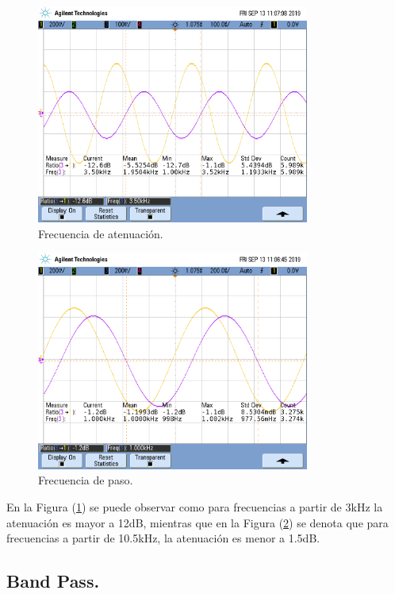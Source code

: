 \begin{figure}[H]	
	\centering
	\includegraphics[width=0.8\textwidth, trim = {0 3.35cm 0 2cm},clip]{ImagenesEj2/MedicionesGrilla/fa_lp.png}
	\caption{Frecuencia de atenuación.}
	\label{fig:falp}
\end{figure}
\begin{figure}[H]	
	\centering
	\includegraphics[width=0.8\textwidth, trim = {0 3.35cm 0 2cm},clip]{ImagenesEj2/MedicionesGrilla/fp_lp.png}
	\caption{Frecuencia de paso.}
	\label{fig:fplp}
\end{figure}

En la Figura (\ref{fig:falp}) se puede observar como para frecuencias a partir de 3kHz la atenuación es mayor a 12dB, mientras que en la Figura (\ref{fig:fplp}) se denota que para frecuencias a partir de 10.5kHz, la atenuación es menor a 1.5dB.

\newpage
\subsection{Band Pass.}
